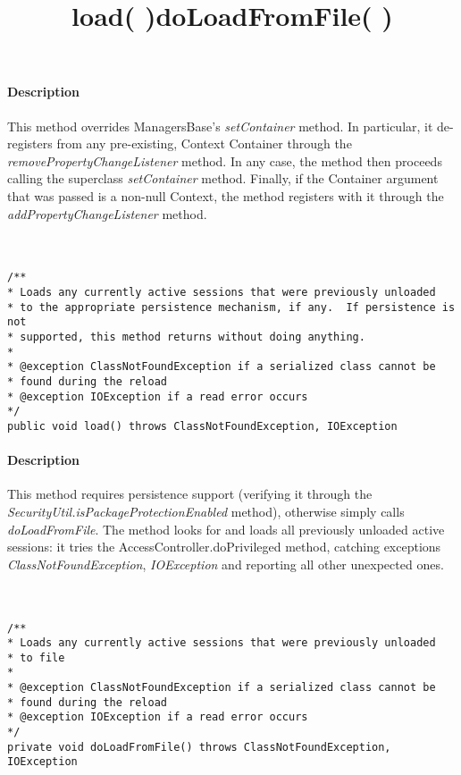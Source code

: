 \paragraph{Description} This method overrides ManagersBase's \textit{setContainer} method. In particular, it de-registers from any pre-existing, Context Container through the \textit{removePropertyChangeListener} method. In any case, the method then proceeds calling the superclass \textit{setContainer} method. Finally, if the Container argument that was passed is a non-null Context, the method registers with it through the \textit{addPropertyChangeListener} method.\\\\\\


\title{{\large \textbf{load( )}}}
\lstset{firstnumber=426}
\begin{lstlisting}
/**
* Loads any currently active sessions that were previously unloaded
* to the appropriate persistence mechanism, if any.  If persistence is not
* supported, this method returns without doing anything.
*
* @exception ClassNotFoundException if a serialized class cannot be
* found during the reload
* @exception IOException if a read error occurs
*/
public void load() throws ClassNotFoundException, IOException
\end{lstlisting}

\paragraph{Description} This method requires persistence support (verifying it through the \textit{SecurityUtil.isPackageProtectionEnabled} method), otherwise simply calls \textit{doLoadFromFile}. The method looks for and loads all previously unloaded active sessions: it tries the AccessController.doPrivileged method, catching exceptions \textit{ClassNotFoundException}, \textit{IOException} and reporting all other unexpected ones. \\\\\\


\title{{\large \textbf{doLoadFromFile( )}}}
\lstset{firstnumber=457}
\begin{lstlisting}
/**
* Loads any currently active sessions that were previously unloaded
* to file
*
* @exception ClassNotFoundException if a serialized class cannot be
* found during the reload
* @exception IOException if a read error occurs
*/
private void doLoadFromFile() throws ClassNotFoundException, IOException 
\end{lstlisting}

